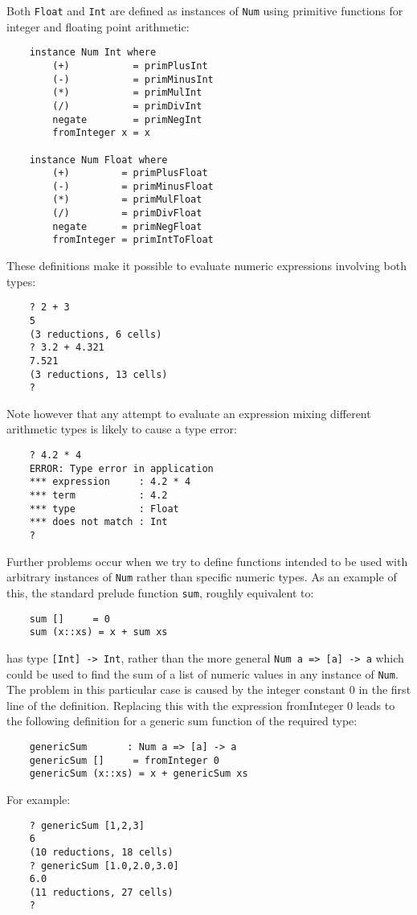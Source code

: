 Both \verb"Float" and \verb"Int" are defined as  
instances  of  \verb"Num"  using  primitive
functions for integer and floating point arithmetic:
\begin{verbatim}
    instance Num Int where
        (+)           = primPlusInt
        (-)           = primMinusInt
        (*)           = primMulInt
        (/)           = primDivInt
        negate        = primNegInt
        fromInteger x = x

    instance Num Float where
        (+)         = primPlusFloat
        (-)         = primMinusFloat
        (*)         = primMulFloat
        (/)         = primDivFloat 
        negate      = primNegFloat
        fromInteger = primIntToFloat
\end{verbatim}
These definitions make it  possible  to  evaluate  numeric  expressions
involving both types:
\begin{verbatim}
    ? 2 + 3
    5
    (3 reductions, 6 cells)
    ? 3.2 + 4.321
    7.521
    (3 reductions, 13 cells)
    ?
\end{verbatim}
Note  however  that  any  attempt  to  evaluate  an  expression  mixing
different arithmetic types is likely to cause a type error:
\begin{verbatim}
    ? 4.2 * 4
    ERROR: Type error in application
    *** expression     : 4.2 * 4
    *** term           : 4.2
    *** type           : Float
    *** does not match : Int
    ?
\end{verbatim}
Further problems occur when we try to define functions intended  to  be
used with arbitrary instances  of  \verb"Num"  rather  than  specific  numeric
types.  As an example of this, the  standard  prelude  function  \verb"sum",
roughly equivalent to:
\begin{verbatim}
    sum []     = 0
    sum (x::xs) = x + sum xs
\end{verbatim}
has type \verb"[Int] -> Int",  
rather than the  more general \verb"Num a => [a] -> a"
which could be used to find the sum of a list of numeric values in  any
instance of \verb"Num".  The problem in this particular case is caused by the
integer constant 0 in the first line of the definition.  Replacing this
with the expression fromInteger 0 leads to the following definition for
a generic sum function of the required type:
\begin{verbatim}
    genericSum       : Num a => [a] -> a
    genericSum []     = fromInteger 0
    genericSum (x::xs) = x + genericSum xs
\end{verbatim}
For example:
\begin{verbatim}
    ? genericSum [1,2,3]
    6
    (10 reductions, 18 cells)
    ? genericSum [1.0,2.0,3.0]
    6.0
    (11 reductions, 27 cells)
    ?
\end{verbatim}

